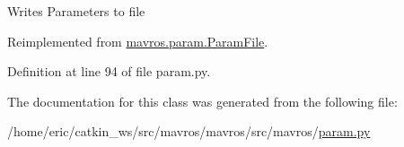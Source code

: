 \begin{DoxyVerb}Writes Parameters to file\end{DoxyVerb}
 

Reimplemented from \mbox{\hyperlink{classmavros_1_1param_1_1ParamFile_ad1027ff8e4ed8681f36e096447d110bb}{mavros.\+param.\+Param\+File}}.



Definition at line 94 of file param.\+py.



The documentation for this class was generated from the following file\+:\begin{DoxyCompactItemize}
\item 
/home/eric/catkin\+\_\+ws/src/mavros/mavros/src/mavros/\mbox{\hyperlink{param_8py}{param.\+py}}\end{DoxyCompactItemize}
